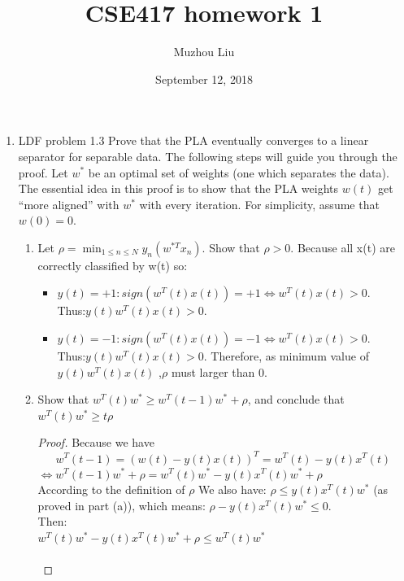 \documentclass[12pt]{article}
\begin{document}

\title{CSE417 homework 1}
\author{Muzhou Liu }
\date{September 12, 2018}
\maketitle


\begin{enumerate}
\item LDF problem 1.3 Prove that the PLA eventually converges to a linear separator for separable data. The following steps will guide you through the proof. Let $w^{*}$ be an optimal set of weights (one which separates the data). The essential idea in this proof is to show that the PLA weights $w(t)$ get “more aligned” with $w^{*}$ with every iteration. For simplicity, assume that $w(0) = 0$.
    \begin{enumerate}
      \item Let  $\rho = \min_{1 \leq n \leq N} {y_{n}(w^{*T}x_{n})}$. Show that $\rho > 0$.
        Because all x(t) are correctly classified by w(t) so:
        \begin{itemize}
          \item $y(t) = + 1: sign(w^{T}(t)x(t)) = + 1 \Leftrightarrow w^{T}(t)x(t) > 0$. \\ Thus:$ y(t)w^{T}(t)x(t) > 0$.
          \item $y(t) = - 1: sign(w^{T}(t)x(t)) = - 1 \Leftrightarrow w^{T}(t)x(t) > 0$. \\ Thus:$ y(t)w^{T}(t)x(t) > 0$.
          Therefore, as minimum value of $y(t)w^{T}(t)x(t) $ ,$\rho$ must larger than 0.
        \end{itemize}
      \item Show that $w^{T}(t)w^{*} \geq w^{T}(t-1)w^{*}+\rho$, and conclude that $ w^{T}(t)w^{*} \geq t\rho$ \\
      \begin{proof}
      Because we have  \begin{equation*}
                         w^{T}(t - 1) = (w(t) - y(t)x(t))^{T} = w^{T}(t) - y(t)x^{T}(t)
                       \end{equation*}
      $\Leftrightarrow  w^{T}(t-1)w^{*}+\rho = w^{T}(t)w^{*} - y(t)x^{T}(t)w^{*} + \rho $ \\
      According to the definition of $\rho$ We also have: $\rho \leq y(t)x^{T}(t)w^{*}$ (as proved in part (a)), which means: $\rho - y(t)x^{T}(t)w^{*} \leq 0$. \\
      Then: \\
      $ w^{T}(t)w^{*} - y(t)x^{T}(t)w^{*} + \rho \leq w^{T}(t)w^{*} $ \\ \\


\end{proof}
\end{enumerate}
\end{enumerate}
\end{document}
